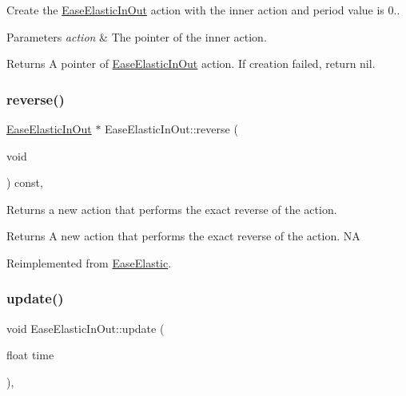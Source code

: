 Create the \hyperlink{classEaseElasticInOut}{Ease\+Elastic\+In\+Out} action with the inner action and period value is 0.. 


\begin{DoxyParams}{Parameters}
{\em action} & The pointer of the inner action. \\
\hline
\end{DoxyParams}
\begin{DoxyReturn}{Returns}
A pointer of \hyperlink{classEaseElasticInOut}{Ease\+Elastic\+In\+Out} action. If creation failed, return nil. 
\end{DoxyReturn}
\mbox{\label{classEaseElasticInOut_a08123565179ad98702f27561605dabae}} 
\subsubsection{\texorpdfstring{reverse()}{reverse()}}
{\footnotesize\ttfamily \hyperlink{classEaseElasticInOut}{Ease\+Elastic\+In\+Out} $\ast$ Ease\+Elastic\+In\+Out\+::reverse (\begin{DoxyParamCaption}\item[{void}]{ }\end{DoxyParamCaption}) const\hspace{0.3cm}{\ttfamily [override]}, {\ttfamily [virtual]}}

Returns a new action that performs the exact reverse of the action.

\begin{DoxyReturn}{Returns}
A new action that performs the exact reverse of the action.  NA 
\end{DoxyReturn}


Reimplemented from \hyperlink{classEaseElastic_a9e0e8c55fbe1c50c706dd3d62834ed82}{Ease\+Elastic}.

\mbox{\label{classEaseElasticInOut_adb67d3b3eec6b3b8fd2b7a22ed72c4f8}} 
\subsubsection{\texorpdfstring{update()}{update()}}
{\footnotesize\ttfamily void Ease\+Elastic\+In\+Out\+::update (\begin{DoxyParamCaption}\item[{float}]{time }\end{DoxyParamCaption})\hspace{0.3cm}{\ttfamily [override]}, {\ttfamily [virtual]}}


